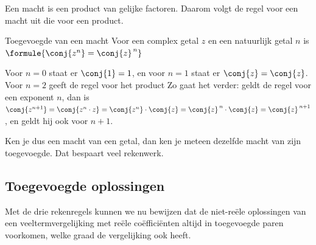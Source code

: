 Een macht is een product van gelijke factoren. Daarom volgt de regel voor een macht uit die voor een product.

\begin{theorie}
\begin{stelling}{Toegevoegde van een macht}
Voor een complex getal $z$ en een natuurlijk getal $n$ is \quad $\formule{\conj{z^n} = \conj{z}^{\,n}}$
\end{stelling}

\begin{bewijs}
Voor $n = 0$ staat er $\conj{1} = 1$, en voor $n = 1$ staat er $\conj{z} = \conj{z}$. Voor $n = 2$ geeft de regel voor het product
Zo gaat het verder: geldt de regel voor een exponent $n$, dan is $\conj{z^{n+1}} = \conj{z^n \cdot z} = \conj{z^n} \cdot \conj{z} = \conj{z}^{\,n} \cdot \conj{z} = \conj{z}^{\,n+1}$, en geldt hij ook voor $n + 1$.
\end{bewijs}
\end{theorie}

Ken je dus een macht van een getal, dan ken je meteen dezelfde macht van zijn toegevoegde. Dat bespaart veel rekenwerk.


\begin{oefeningen}
\end{oefeningen}

\subsection{Toegevoegde oplossingen}

Met de drie rekenregels kunnen we nu bewijzen dat de niet-reële oplossingen van een veeltermvergelijking met reële coëfficiënten altijd in toegevoegde paren voorkomen, welke graad de vergelijking ook heeft.

